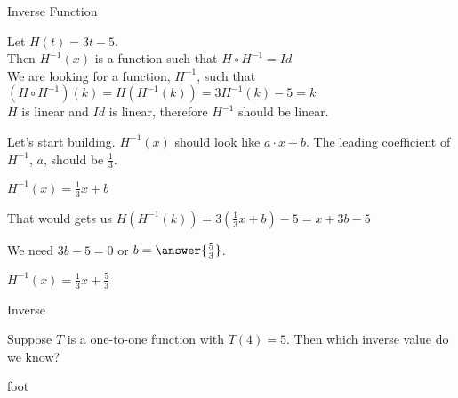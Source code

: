 \documentclass{ximera}
\begin{document}
\begin{example} Inverse Function


Let $H(t) = 3t - 5$. \\

Then $H^{-1}(x)$ is a function such that $H \circ H^{-1} = Id$ \\


We are looking for a function, $H^{-1}$, such that $(H \circ H^{-1})(k) = H(H^{-1}(k)) = 3 H^{-1}(k) - 5 = k$ \\



$H$ is linear and $Id$ is linear, therefore $H^{-1}$ should be linear.

Let's start building.  $H^{-1}(x)$ should look like $a \cdot x + b$.  The leading coefficient of $H^{-1}$, $a$, should be $\frac{1}{3}$.


$H^{-1}(x) =\frac{1}{3} x + b$


That would gets us $H(H^{-1}(k)) = 3 (\frac{1}{3}x + b) - 5 = x + 3b - 5 $


We need $3b - 5 = 0$ or $b = \answer{\frac{5}{3}}$.


$H^{-1}(x) =\frac{1}{3} x + \frac{5}{3}$



\end{example}




\begin{question} Inverse


Suppose $T$ is a one-to-one function with $T(4) = 5$. Then which inverse value do we know?


\begin{multipleChoice}
\end{multipleChoice}

\end{question}


















foot
\end{document}
